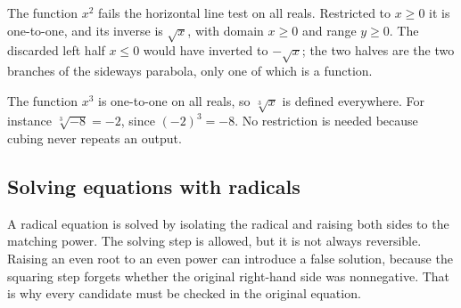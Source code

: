 \documentclass[12pt]{book}
\begin{document}
\begin{example}
The function $x^2$ fails the horizontal line test on all reals. Restricted to $x\ge0$
it is one-to-one, and its inverse is $\sqrt{x}$, with domain $x\ge0$ and range
$y\ge0$. The discarded left half $x\le0$ would have inverted to $-\sqrt{x}$; the two
halves are the two branches of the sideways parabola, only one of which is a function.
\end{example}

\begin{example}
The function $x^3$ is one-to-one on all reals, so $\sqrt[3]{x}$ is defined everywhere.
For instance $\sqrt[3]{-8}=-2$, since $(-2)^3=-8$. No restriction is needed because
cubing never repeats an output.
\end{example}

\begin{center}
\end{center}

\subsection{Solving equations with radicals}

A radical equation is solved by isolating the radical and raising both sides to the
matching power. The solving step is allowed, but it is not always reversible. Raising an
even root to an even power can introduce a false solution, because the squaring step
forgets whether the original right-hand side was nonnegative. That is why every
candidate must be checked in the original equation.
\end{document}
